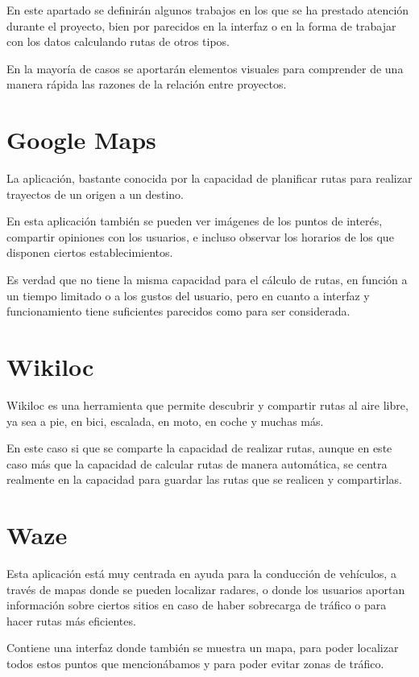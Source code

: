 
En este apartado se definirán algunos trabajos en los que se ha prestado atención durante el proyecto, bien por parecidos en la interfaz o en la forma de trabajar con los datos calculando rutas de otros tipos.

En la mayoría de casos se aportarán elementos visuales para comprender de una manera rápida las razones de la relación entre proyectos.


\section{Google Maps}

La aplicación, bastante conocida por la capacidad de planificar rutas para realizar trayectos de un origen a un destino. \cite{maps}

En esta aplicación también se pueden ver imágenes de los puntos de interés, compartir opiniones con los usuarios, e incluso observar los horarios de los que disponen ciertos establecimientos. 

Es verdad que no tiene la misma capacidad para el cálculo de rutas, en función a un tiempo limitado o a los gustos del usuario, pero en cuanto a interfaz y funcionamiento tiene suficientes parecidos como para ser considerada.


\section{Wikiloc}

Wikiloc es una herramienta que permite descubrir y compartir rutas al aire libre, ya sea a pie, en bici, escalada, en moto, en coche y muchas más. \cite{wikiloc}

En este caso si que se comparte la capacidad de realizar rutas, aunque en este caso más que la capacidad de calcular rutas de manera automática, se centra realmente en la capacidad para guardar las rutas que se realicen y compartirlas.


\section{Waze}

Esta aplicación está muy centrada en ayuda para la conducción de vehículos, a través de mapas donde se pueden localizar radares, o donde los usuarios aportan información sobre ciertos sitios en caso de haber sobrecarga de tráfico o para hacer rutas más eficientes. \cite{waze}

Contiene una interfaz donde también se muestra un mapa, para poder localizar todos estos puntos que mencionábamos y para poder evitar zonas de tráfico.
